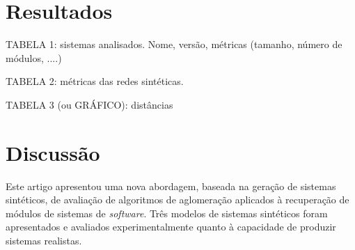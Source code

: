 \documentclass{acm_proc_article-sp}
\begin{document}




\section{Resultados} \label{sec:resultados}

TABELA 1: sistemas analisados. Nome, versão, métricas (tamanho, número de módulos, ....)

TABELA 2: métricas das redes sintéticas.

TABELA 3 (ou GRÁFICO): distâncias


\section{Discussão} \label{sec:discussao} %

Este artigo apresentou uma nova abordagem, baseada na geração de sistemas sintéticos, de avaliação de algoritmos de aglomeração aplicados à recuperação de módulos de sistemas de \emph{software}. Três modelos de sistemas sintéticos foram apresentados e avaliados experimentalmente quanto à capacidade de produzir sistemas realistas.
\end{document}
